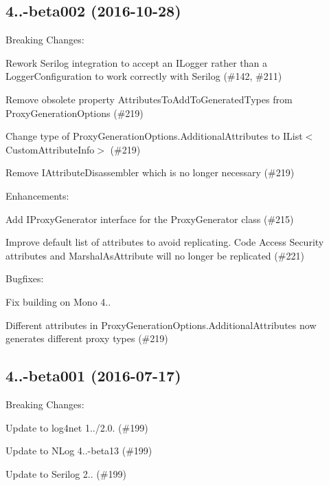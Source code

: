 \subsection*{4..-\/beta002 (2016-\/10-\/28)}

Breaking Changes\+:
\begin{DoxyItemize}
\item Rework Serilog integration to accept an I\+Logger rather than a Logger\+Configuration to work correctly with Serilog (\#142, \#211)
\item Remove obsolete property {\ttfamily Attributes\+To\+Add\+To\+Generated\+Types} from {\ttfamily Proxy\+Generation\+Options} (\#219)
\item Change type of {\ttfamily Proxy\+Generation\+Options.\+Additional\+Attributes} to {\ttfamily I\+List$<$Custom\+Attribute\+Info$>$} (\#219)
\item Remove {\ttfamily I\+Attribute\+Disassembler} which is no longer necessary (\#219)
\end{DoxyItemize}

Enhancements\+:
\begin{DoxyItemize}
\item Add I\+Proxy\+Generator interface for the Proxy\+Generator class (\#215)
\item Improve default list of attributes to avoid replicating. Code Access Security attributes and Marshal\+As\+Attribute will no longer be replicated (\#221)
\end{DoxyItemize}

Bugfixes\+:
\begin{DoxyItemize}
\item Fix building on Mono 4..
\item Different attributes in {\ttfamily Proxy\+Generation\+Options.\+Additional\+Attributes} now generates different proxy types (\#219)
\end{DoxyItemize}

\subsection*{4..-\/beta001 (2016-\/07-\/17)}

Breaking Changes\+:
\begin{DoxyItemize}
\item Update to log4net 1../2.0. (\#199)
\item Update to N\+Log 4..-\/beta13 (\#199)
\item Update to Serilog 2.. (\#199)
\end{DoxyItemize}

